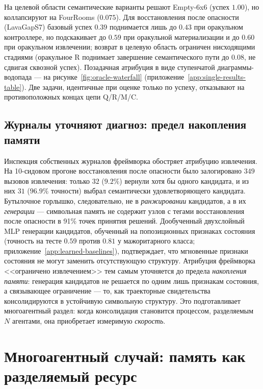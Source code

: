 \documentclass{article}
\begin{document}
На целевой области семантические варианты решают Empty-6x6 (успех $1.00$), но коллапсируют на FourRooms ($0.075$). Для восстановления после опасности (LavaGapS7) базовый успех $0.39$ поднимается лишь до $0.43$ при оракульном контроллере, но подскакивает до $0.59$ при оракульной материализации и до $0.60$ при оракульном извлечении; возврат в целевую область ограничен нисходящими стадиями (оракульное R поднимает завершение семантического пути до $0.08$, не сдвигая сквозной успех). Позадачная атрибуция в виде ступенчатой диаграммы-водопада --- на рисунке~\ref{fig:oracle-waterfall} (приложение~\ref{app:single-results-table}). Две задачи, идентичные при оценке только по успеху, отказывают на противоположных концах цепи Q/R/M/C.

\subsection{Журналы уточняют диагноз: предел накопления памяти}
\label{sec:refined-attribution}

Инспекция собственных журналов фреймворка обостряет атрибуцию извлечения. На 10-сидовом прогоне восстановления после опасности было залогировано $349$ вызовов извлечения: только $32$ ($9.2\%$) вернули хотя бы одного кандидата, и из них $31$ ($96.9\%$ точности) выбрал семантически удовлетворяющего кандидата. Бутылочное горлышко, следовательно, не в \emph{ранжировании} кандидатов, а в их \emph{генерации} --- символьная память не содержит узлов с тегами восстановления после опасности в 91\% точек принятия решений. Дообученный двухслойный MLP генерации кандидатов, обученный на попозиционных признаках состояния (точность на тесте $0.59$ против $0.81$ у мажоритарного класса; приложение~\ref{app:learned-baselines}), подтверждает, что мгновенные признаки состояния не могут заменить отсутствующую структуру. Атрибуция фреймворка <<ограничено извлечением>> тем самым уточняется до предела \emph{накопления памяти}: генерация кандидатов не решается по одним лишь признакам состояния, а связывающее ограничение --- то, как траекторные свидетельства консолидируются в устойчивую символьную структуру. Это подготавливает многоагентный раздел: когда консолидация становится процессом, разделяемым $N$ агентами, она приобретает измеримую \emph{скорость}.

\section{Многоагентный случай: память как разделяемый ресурс}
\label{sec:multi}
\end{document}
